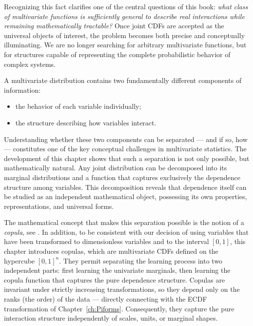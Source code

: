 Recognizing this fact clarifies one of the central questions of this book: \emph{what class of multivariate functions is sufficiently general to describe real interactions while remaining mathematically tractable?} Once joint CDFs are accepted as the universal objects of interest, the problem becomes both precise and conceptually illuminating. We are no longer searching for arbitrary multivariate functions, but for structures capable of representing the complete probabilistic behavior of complex systems.

A multivariate distribution contains two fundamentally different components of information:
\begin{itemize}
\item the behavior of each variable individually;
\item the structure describing how variables interact.
\end{itemize}
Understanding whether these two components can be separated — and if so, how — constitutes one of the key conceptual challenges in multivariate statistics. The development of this chapter shows that such a separation is not only possible, but mathematically natural. Any joint distribution can be decomposed into its marginal distributions and a function that captures exclusively the dependence structure among variables. This decomposition reveals that dependence itself can be studied as an independent mathematical object, possessing its own properties, representations, and universal forms.

The mathematical concept that makes this separation possible is the notion of a \emph{copula}, see \cite{DuranteSempi2015}. In addition, to be consistent with our decision of using variables that have been transformed to dimensionless variables and to the interval
$[0,1]$, this chapter introduces copulas, which are multivariate CDFs defined on the hypercube $[0,1]^n$. They permit separating the learning process into two independent parts: first learning the univariate marginals, then learning the copula function that captures the pure dependence structure. Copulas are invariant under strictly increasing transformations, so they depend only on the ranks (the order) of the data — directly connecting with the ECDF transformation of Chapter~\ref{ch:Piforms}. Consequently, they capture the pure interaction structure independently of scales, units, or marginal shapes.

